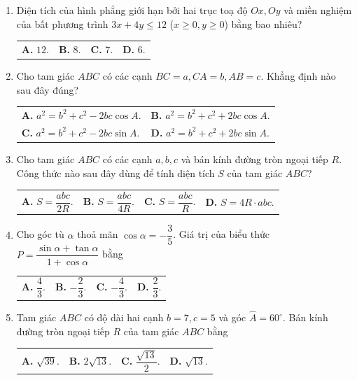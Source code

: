 \documentclass[12pt,a4paper]{article}
\makeatletter
\newcommand{\four}[4]{\par\noindent\begin{tabularx}{\linewidth}{@{}*{4}{>{\raggedright\arraybackslash}X}@{}}\textbf{A.} #1&\textbf{B.} #2&\textbf{C.} #3&\textbf{D.} #4\end{tabularx}}
\newcommand{\two}[4]{\par\noindent\begin{tabularx}{\linewidth}{@{}*{2}{>{\raggedright\arraybackslash}X}@{}}\textbf{A.} #1&\textbf{B.} #2\\[3.8pt]\textbf{C.} #3&\textbf{D.} #4\end{tabularx}}
\makeatother
\begin{document}
\begin{enumerate}
\item Diện tích của hình phẳng giới hạn bởi hai trục toạ độ $Ox, Oy$ và miền nghiệm của bất phương trình $3x + 4y \le 12$ ($x \ge 0, y \ge 0$) bằng bao nhiêu?
\four{$12$.}{$8$.}{$7$.}{$6$.}

\item Cho tam giác $ABC$ có các cạnh $BC = a, CA = b, AB = c$. Khẳng định nào sau đây đúng?
\two{$a^2 = b^2 + c^2 - 2bc \cos A$.}{$a^2 = b^2 + c^2 + 2bc \cos A$.}{$a^2 = b^2 + c^2 - 2bc \sin A$.}{$a^2 = b^2 + c^2 + 2bc \sin A$.}

\item Cho tam giác $ABC$ có các cạnh $a, b, c$ và bán kính đường tròn ngoại tiếp $R$. Công thức nào sau đây dùng để tính diện tích $S$ của tam giác $ABC$?
\four{$S = \dfrac{abc}{2R}$.}{$S = \dfrac{abc}{4R}$.}{$S = \dfrac{abc}{R}$.}{$S = 4R \cdot abc$.}

\item Cho góc tù $\alpha$ thoả mãn $\cos \alpha = -\dfrac{3}{5}$. Giá trị của biểu thức $P = \dfrac{\sin \alpha + \tan \alpha}{1 + \cos \alpha}$ bằng
\four{$\dfrac{4}{3}$.}{$-\dfrac{2}{3}$.}{$-\dfrac{4}{3}$.}{$\dfrac{2}{3}$.}

\item Tam giác $ABC$ có độ dài hai cạnh $b = 7, c = 5$ và góc $\widehat{A} = 60^\circ$. Bán kính đường tròn ngoại tiếp $R$ của tam giác $ABC$ bằng
\four{$\sqrt{39}$.}{$2\sqrt{13}$.}{$\dfrac{\sqrt{13}}{2}$.}{$\sqrt{13}$.}
\end{enumerate}
\newpage
\end{document}
